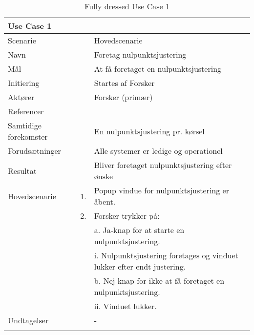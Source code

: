 \begin{longtabu} to  %
	{\large \textbf{Use Case 1}} && \\
	\toprule
	Scenarie 				&&	Hovedscenarie\\
	Navn 					&& 	Foretag nulpunktsjustering\\
	Mål 					&& 	At få foretaget en nulpunktsjustering\\
	Initiering 				&& 	Startes af Forsker\\
	Aktører 				&& 	Forsker (primær)\\
	Referencer 				&& 	\\
	Samtidige forekomster  	&& 	En nulpunktsjustering pr. kørsel \\
	Forudsætninger 			&&	Alle systemer er ledige og operationel\\ 
	Resultat 				&& 	Bliver foretaget nulpunktsjustering efter ønske\\ \midrule
	Hovedscenarie 			&    1. 	&	Popup vindue for nulpunktsjustering er åbent.\\				 	
							&    2. 	& 	Forsker trykker på:\\ 
							& 			&	a. Ja-knap for at starte en nulpunktsjustering.\\[-1ex]
							& 			&		 i. Nulpunktsjustering foretages og vinduet lukker efter endt justering.\\[-1ex]
							& 			&  	b. Nej-knap for ikke at få foretaget en nulpunktsjustering.\\[-1ex]
							& 			&   ii. Vinduet lukker.\\[-1ex]	
	Undtagelser 			&			& 	-  \\ \bottomrule
	
	\caption{Fully dressed Use Case 1}
	\label{UC1}
\end{longtabu}

